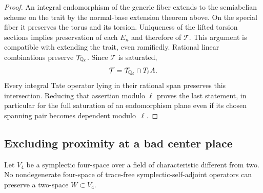 \begin{proof}
An integral endomorphism of the generic fiber extends to the
semiabelian scheme on the trait by the normal-base extension theorem
above.  On the special fiber it preserves the torus and its torsion.
Uniqueness of the lifted torsion sections implies preservation of
each $E_n$ and therefore of $\mathcal T$.  This argument is
compatible with extending the trait, even ramifiedly.  Rational
linear combinations preserve $\mathcal T_{\mathbb Q_\ell}$.
Since $\mathcal T$ is saturated,
\[
 \mathcal T=\mathcal T_{\mathbb Q_\ell}\cap T_\ell A.
\]
Every integral Tate operator lying in their rational span preserves
this intersection.  Reducing that assertion modulo $\ell$ proves
the last statement, in particular for the full saturation of an
endomorphism plane even if its chosen spanning pair becomes
dependent modulo~$\ell$.
\end{proof}

\subsection{Excluding proximity at a bad center place}

\begin{lemma}\label{inc:stabilizer}
Let $V_4$ be a symplectic four-space over a field of characteristic
different from two.  No nondegenerate four-space of trace-free
symplectic-self-adjoint operators can preserve a two-space
$W\subset V_4$.
\end{lemma}

